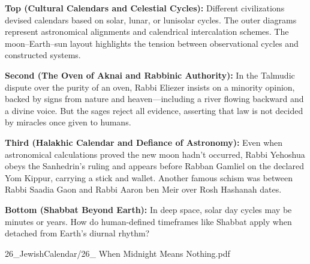 \begin{SideNotePage}{

    \textbf{Top (Cultural Calendars and Celestial Cycles):}  
    Different civilizations devised calendars based on solar, lunar, or lunisolar cycles. The outer diagrams represent astronomical alignments and calendrical intercalation schemes. The moon–Earth–sun layout highlights the tension between observational cycles and constructed systems. \par
  
    \textbf{Second (The Oven of Aknai and Rabbinic Authority):}  
    In the Talmudic dispute over the purity of an oven, Rabbi Eliezer insists on a minority opinion, backed by signs from nature and heaven—including a river flowing backward and a divine voice. But the sages reject all evidence, asserting that law is not decided by miracles once given to humans. \par
  
    \textbf{Third (Halakhic Calendar and Defiance of Astronomy):}  
    Even when astronomical calculations proved the new moon hadn’t occurred, Rabbi Yehoshua obeys the Sanhedrin’s ruling and appears before Rabban Gamliel on the declared Yom Kippur, carrying a stick and wallet. Another famous schism was between Rabbi Saadia Gaon and Rabbi Aaron ben Meir over Rosh Hashanah dates. \par
  
    \textbf{Bottom (Shabbat Beyond Earth):}  
    In deep space, solar day cycles may be minutes or years. How do human-defined timeframes like Shabbat apply when detached from Earth's diurnal rhythm? \par
  
}{26_JewishCalendar/26_ When Midnight Means Nothing.pdf}
\end{SideNotePage}
